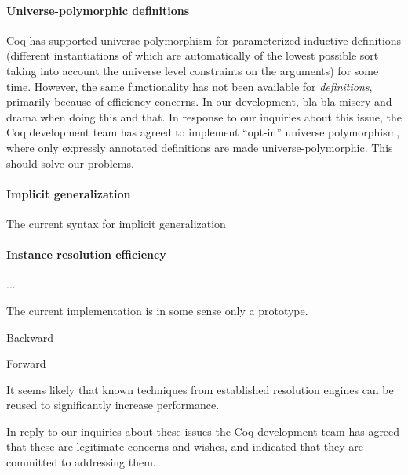 \documentclass[a4paper,10pt,runningheads]{llncs}
\begin{document}
\paragraph{Universe-polymorphic definitions}
Coq has supported universe-polymorphism for parameterized inductive definitions (different instantiations of which are automatically of the lowest possible sort taking into account the universe level constraints on the arguments) for some time. However, the same functionality has not been available for \emph{definitions}, primarily because of efficiency concerns. In our development, bla bla misery and drama when doing this and that. In response to our inquiries about this issue, the Coq development team has agreed to implement ``opt-in'' universe polymorphism, where only expressly annotated definitions are made universe-polymorphic. This should solve our problems.

\paragraph{Implicit generalization}

The current syntax for implicit generalization 

\paragraph{Instance resolution efficiency} ...

The current implementation is in some sense only a prototype.

Backward

Forward

It seems likely that known techniques from established resolution engines can be reused to significantly increase performance.


In reply to our inquiries about these issues the Coq development team has agreed that these are legitimate concerns and wishes, and indicated that they are committed to addressing them.
\end{document}
